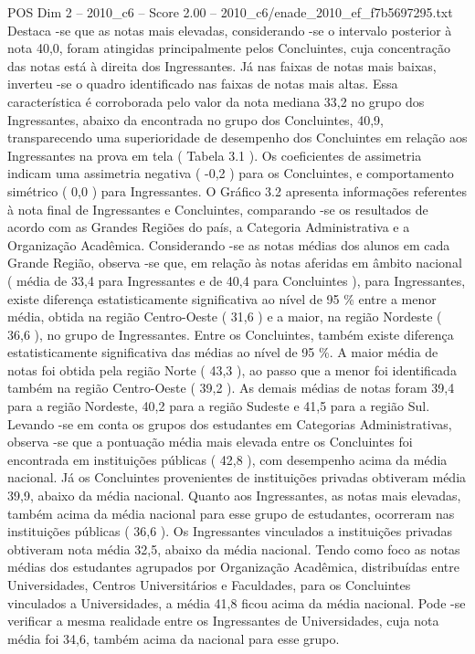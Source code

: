 \begin{textsample}{POS Dim 2 – 2010\_c6 – Score 2.00 – 2010\_c6/enade\_2010\_ef\_f7b5697295.txt}
Destaca -se que as notas mais elevadas, considerando -se o intervalo posterior à nota 40,0, foram atingidas principalmente pelos Concluintes, cuja concentração das notas está à direita dos Ingressantes.
Já nas faixas de notas mais baixas, inverteu -se o quadro identificado nas faixas de notas mais altas.
Essa característica é corroborada pelo valor da nota mediana 33,2 no grupo dos Ingressantes, abaixo da encontrada no grupo dos Concluintes, 40,9, transparecendo uma superioridade de desempenho dos Concluintes em relação aos Ingressantes na prova em tela ( Tabela 3.1 ).
Os coeficientes de assimetria indicam uma assimetria negativa ( -0,2 ) para os Concluintes, e comportamento simétrico ( 0,0 ) para Ingressantes.
O Gráfico 3.2 apresenta informações referentes à nota final de Ingressantes e Concluintes, comparando -se os resultados de acordo com as Grandes Regiões do país, a Categoria Administrativa e a Organização Acadêmica.
Considerando -se as notas médias dos alunos em cada Grande Região, observa -se que, em relação às notas aferidas em âmbito nacional ( média de 33,4 para Ingressantes e de 40,4 para Concluintes ), para Ingressantes, existe diferença estatisticamente significativa ao nível de 95 \% entre a menor média, obtida na região Centro-Oeste ( 31,6 ) e a maior, na região Nordeste ( 36,6 ), no grupo de Ingressantes.
Entre os Concluintes, também existe diferença estatisticamente significativa das médias ao nível de 95 \%.
A maior média de notas foi obtida pela região Norte ( 43,3 ), ao passo que a menor foi identificada também na região Centro-Oeste ( 39,2 ).
As demais médias de notas foram 39,4 para a região Nordeste, 40,2 para a região Sudeste e 41,5 para a região Sul.
Levando -se em conta os grupos dos estudantes em Categorias Administrativas, observa -se que a pontuação média mais elevada entre os Concluintes foi encontrada em instituições públicas ( 42,8 ), com desempenho acima da média nacional.
Já os Concluintes provenientes de instituições privadas obtiveram média 39,9, abaixo da média nacional.
Quanto aos Ingressantes, as notas mais elevadas, também acima da média nacional para esse grupo de estudantes, ocorreram nas instituições públicas ( 36,6 ).
Os Ingressantes vinculados a instituições privadas obtiveram nota média 32,5, abaixo da média nacional.
Tendo como foco as notas médias dos estudantes agrupados por Organização Acadêmica, distribuídas entre Universidades, Centros Universitários e Faculdades, para os Concluintes vinculados a Universidades, a média 41,8 ficou acima da média nacional.
Pode -se verificar a mesma realidade entre os Ingressantes de Universidades, cuja nota média foi 34,6, também acima da nacional para esse grupo.

\end{textsample}
